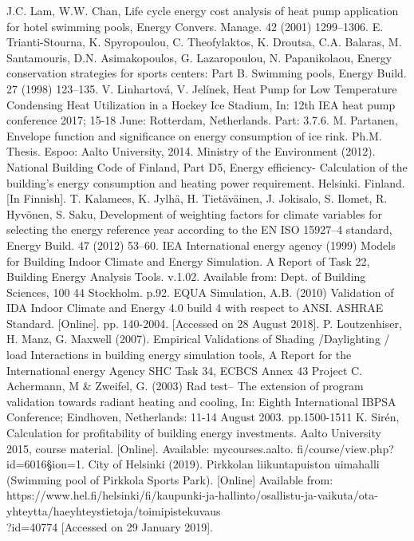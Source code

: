 \documentclass[hyperref]{ctexart}
\begin{document}
\begin{multicols}{2}
\begin{thebibliography}{100}
			 J.C. Lam, W.W. Chan, Life cycle energy cost analysis of heat pump application for hotel swimming pools, Energy Convers. Manage. 42 (2001) 1299–1306. 
			 E. Trianti-Stourna, K. Spyropoulou, C. Theofylaktos, K. Droutsa, C.A. Balaras, M. Santamouris, D.N. Asimakopoulos, G. Lazaropoulou, N. Papanikolaou, Energy conservation strategies for sports centers: Part B. Swimming pools, Energy Build. 27 (1998) 123–135. 
			 V. Linhartová, V. Jelínek, Heat Pump for Low Temperature Condensing Heat Utilization in a Hockey Ice Stadium, In: 12th IEA heat pump conference 2017; 15-18 June: Rotterdam, Netherlands. Part: 3.7.6. 
			 M. Partanen, Envelope function and significance on energy consumption of ice rink. Ph.M. Thesis. Espoo: Aalto University, 2014. 
			 Ministry of the Environment (2012). National Building Code of Finland, Part D5, Energy efficiency- Calculation of the building’s energy consumption and heating power requirement. Helsinki. Finland. [In Finnish]. 
			 T. Kalamees, K. Jylhä, H. Tietäväinen, J. Jokisalo, S. Ilomet, R. Hyvönen, S. Saku, Development of weighting factors for climate variables for selecting the energy reference year according to the EN ISO 15927–4 standard, Energy Build. 47 (2012) 53–60. 
			 IEA International energy agency (1999) Models for Building Indoor Climate and Energy Simulation. A Report of Task 22, Building Energy Analysis Tools. v.1.02. Available from: Dept. of Building Sciences, 100 44 Stockholm. p.92. 
			 EQUA Simulation, A.B. (2010) Validation of IDA Indoor Climate and Energy 4.0 build 4 with respect to ANSI. ASHRAE Standard. [Online]. pp. 140-2004. [Accessed on 28 August 2018]. 
			 P. Loutzenhiser, H. Manz, G. Maxwell (2007). Empirical Validations of Shading /Daylighting / load Interactions in building energy simulation tools, A Report for the International energy Agency SHC Task 34, ECBCS Annex 43 Project C. 
			 Achermann, M \& Zweifel, G. (2003) Rad test– The extension of program validation towards radiant heating and cooling, In: Eighth International IBPSA Conference; Eindhoven, Netherlands: 11-14 August 2003. pp.1500-1511 
			 K. Sirén, Calculation for profitability of building energy investments. Aalto University 2015, course material. [Online]. Available: mycourses.aalto. fi/course/view.php?id=6016§ion=1. 
			 City of Helsinki (2019). Pirkkolan liikuntapuiston uimahalli (Swimming pool of Pirkkola Sports Park). [Online] Available from: https://www.hel.fi/helsinki/fi/kaupunki-ja-hallinto/osallistu-ja-vaikuta/ota-yhteytta/haeyhteystietoja/toimipistekuvaus\\?id=40774 [Accessed on 29 January 2019]. 

\end{thebibliography}
\end{multicols}
\end{document}
